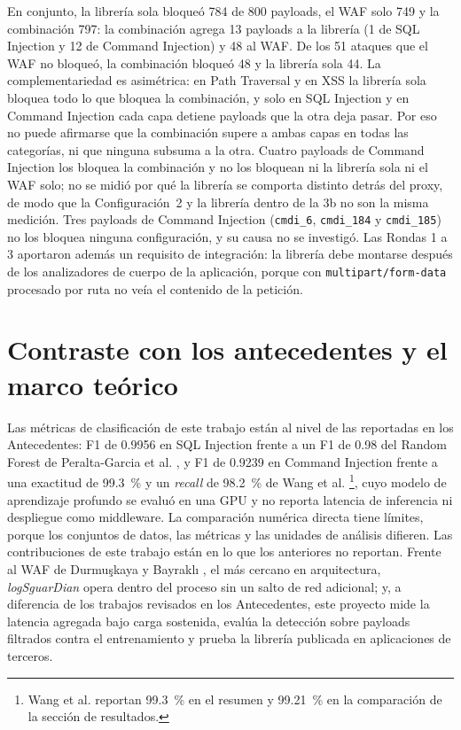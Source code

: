 En conjunto, la librería sola bloqueó 784 de 800 payloads, el WAF solo 749 y la combinación 797: la
combinación agrega 13 payloads a la librería (1 de SQL Injection y 12 de Command Injection) y 48
al WAF. De los 51 ataques que el WAF no bloqueó, la combinación bloqueó 48 y la librería sola 44. La
complementariedad es asimétrica: en Path Traversal y en XSS la librería sola bloquea todo lo que
bloquea la combinación, y solo en SQL Injection y en Command Injection cada capa detiene payloads
que la otra deja pasar. Por eso no puede afirmarse que la combinación supere a ambas capas en todas
las categorías, ni que ninguna subsuma a la otra. Cuatro payloads de Command Injection los bloquea
la combinación y no los bloquean ni la librería sola ni el WAF solo; no se midió por qué la librería
se comporta distinto detrás del proxy, de modo que la Configuración~2 y la librería dentro de la 3b
no son la misma medición. Tres payloads de Command Injection (\texttt{cmdi\_6}, \texttt{cmdi\_184}
y \texttt{cmdi\_185}) no los bloquea ninguna configuración, y su causa no se investigó. Las Rondas 1 a 3 aportaron
además un requisito de integración: la librería debe montarse después de los analizadores de
cuerpo de la aplicación, porque con \texttt{multipart/form-data} procesado por ruta no veía el
contenido de la petición.

\section{Contraste con los antecedentes y el marco teórico}

Las métricas de clasificación de este trabajo están al nivel de las reportadas en los
Antecedentes: F1 de 0.9956 en SQL Injection frente a un F1 de 0.98 del Random Forest de Peralta-Garcia et al.
\cite{peralta2024sql}, y F1 de 0.9239 en Command Injection frente a una exactitud de 99.3~\% y un
\textit{recall} de 98.2~\% de Wang et al. \cite{seyyar2024}\footnote{Wang et al. reportan 99.3~\% en
el resumen y 99.21~\% en la comparación de la sección de resultados.}, cuyo modelo de aprendizaje
profundo se evaluó en una GPU y no reporta latencia de inferencia ni despliegue como middleware. La comparación numérica directa tiene límites, porque los
conjuntos de datos, las métricas y las unidades de análisis difieren. Las contribuciones de este
trabajo están en lo que los anteriores no reportan. Frente al WAF de Durmuşkaya y Bayraklı \cite{durmuskaya2025waf}, el más cercano en arquitectura, \textit{logSguarDian} opera dentro del proceso sin un salto de red
adicional; y, a diferencia de los trabajos revisados en los Antecedentes, este proyecto mide la latencia agregada
bajo carga sostenida, evalúa la detección sobre payloads filtrados contra el entrenamiento y prueba
la librería publicada en aplicaciones de terceros.

